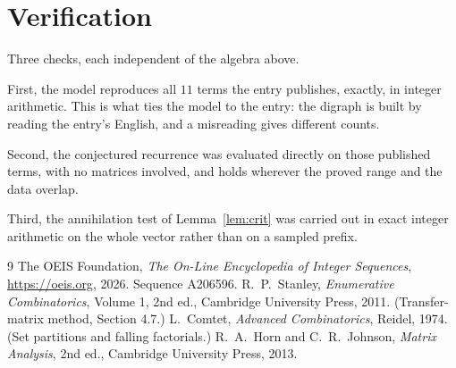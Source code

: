 \documentclass[11pt,a4paper]{article}
\theoremstyle{plain}
\theoremstyle{definition}
\begin{document}
\section{Verification}

Three checks, each independent of the algebra above.

First, the model reproduces all $11$ terms the entry publishes, exactly, in integer
arithmetic. This is what ties the model to the entry: the digraph is built by reading the
entry's English, and a misreading gives different counts.

Second, the conjectured recurrence was evaluated directly on those published terms, with no
matrices involved, and holds wherever the proved range and the data overlap.

Third, the annihilation test of Lemma~\ref{lem:crit} was carried out in exact integer
arithmetic on the whole vector rather than on a sampled prefix.

\begin{thebibliography}{9}
 The OEIS Foundation, \emph{The On-Line Encyclopedia of Integer
Sequences}, \url{https://oeis.org}, 2026. Sequence A206596.
 R.~P.~Stanley, \emph{Enumerative Combinatorics}, Volume 1, 2nd ed.,
Cambridge University Press, 2011. (Transfer-matrix method, Section 4.7.)
 L.~Comtet, \emph{Advanced Combinatorics}, Reidel, 1974. (Set partitions
and falling factorials.)
 R.~A.~Horn and C.~R.~Johnson, \emph{Matrix Analysis}, 2nd ed., Cambridge
University Press, 2013.
\end{thebibliography}
\end{document}
